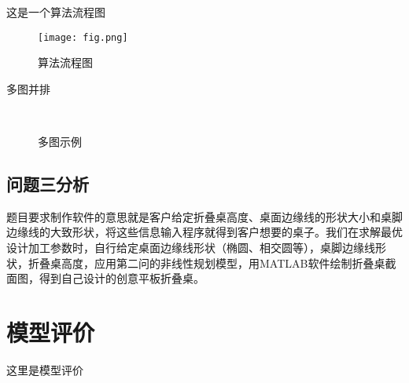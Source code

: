 \documentclass[bwprint]{gmcmthesis}
\begin{document}
这是一个算法流程图
\begin{figure}[htp!]
\centering
\texttt{[image: fig.png]}
\caption{算法流程图}
\end{figure}

多图并排
\begin{figure}[!htp]
	\centering
	\qquad
	 \\
	\qquad
	\caption{多图示例}
\end{figure}


\clearpage
\subsection{问题三分析}

题目要求制作软件的意思就是客户给定折叠桌高度、桌面边缘线的形状大小和桌脚边缘线的大致形状，将这些信息输入程序就得到客户想要的桌子。我们在求解最优设计加工参数时，自行给定桌面边缘线形状（椭圆、相交圆等），桌脚边缘线形状，折叠桌高度，应用第二问的非线性规划模型，用MATLAB软件绘制折叠桌截面图，得到自己设计的创意平板折叠桌。


\section{模型评价}

这里是模型评价




\cite{mittelbach_latex_2004,wright_latex3_2009,beeton_unicode_2008,vieth_experiences_2009,ls:2024}



\end{document}
